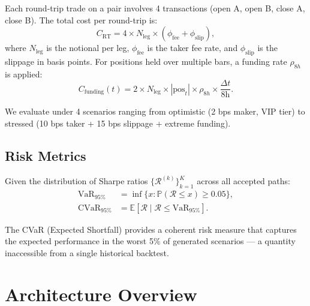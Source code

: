 \documentclass[11pt, a4paper]{article}
\newcommand{\E}{\mathbb{E}}
\newcommand{\Prob}{\mathbb{P}}
\begin{document}
Each round-trip trade on a pair involves 4 transactions (open A, open B, close A, close B). The total cost per round-trip is:
\begin{equation}
    C_{\text{RT}} = 4 \times N_{\text{leg}} \times (\phi_{\text{fee}} + \phi_{\text{slip}}),
\end{equation}
where $N_{\text{leg}}$ is the notional per leg, $\phi_{\text{fee}}$ is the taker fee rate, and $\phi_{\text{slip}}$ is the slippage in basis points. For positions held over multiple bars, a funding rate $\rho_{8h}$ is applied:
\begin{equation}
    C_{\text{funding}}(t) = 2 \times N_{\text{leg}} \times |\text{pos}_t| \times \rho_{8h} \times \frac{\Delta t}{8\text{h}}.
\end{equation}

We evaluate under 4 scenarios ranging from optimistic (2 bps maker, VIP tier) to stressed (10 bps taker + 15 bps slippage + extreme funding).

\subsection{Risk Metrics}

Given the distribution of Sharpe ratios $\{\mathcal{R}^{(k)}\}_{k=1}^K$ across all accepted paths:
\begin{align}
    \text{VaR}_{95\%} &= \inf\{x : \Prob(\mathcal{R} \leq x) \geq 0.05\}, \\
    \text{CVaR}_{95\%} &= \E\left[\mathcal{R} \mid \mathcal{R} \leq \text{VaR}_{95\%}\right].
\end{align}

The CVaR (Expected Shortfall) provides a coherent risk measure that captures the expected performance in the worst 5\% of generated scenarios --- a quantity inaccessible from a single historical backtest.

\section{Architecture Overview}
\label{sec:arch}
\end{document}

